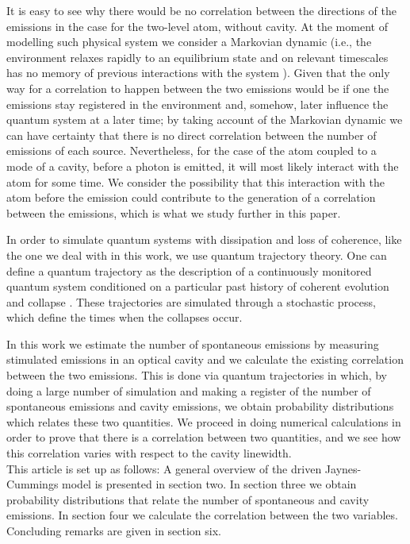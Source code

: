 \documentclass[conference]{IEEEtran}
\begin{document}
It is easy to see why there would be no correlation between the directions of the emissions in the case for the two-level atom, without cavity. At the moment of modelling such physical system we consider a Markovian dynamic (i.e., the environment relaxes rapidly to an equilibrium state and on relevant timescales has no memory of previous interactions with the system \cite{daley2014quantum}). Given that the only way for a correlation to happen between the two emissions would be if one the emissions stay registered in the environment and, somehow, later influence the quantum system at a later time; by taking account of the Markovian dynamic we can have certainty that there is no direct correlation between the number of emissions of each source. Nevertheless, for the case of the atom coupled to a mode of a cavity, before a photon is emitted, it will most likely interact with the atom for some time. We consider the possibility that this interaction with the atom before the emission could contribute to the generation of a correlation between the emissions, which is what we study further in this paper.

In order to simulate quantum systems with dissipation and loss of coherence, like the one we deal with in this work, we use quantum trajectory theory. %
One can define a quantum trajectory as the description of a continuously monitored quantum system conditioned on a particular past history of coherent evolution and collapse \cite{Carmichael1993Open}. These trajectories are simulated through a stochastic process, which define the times when the collapses occur.

In this work we estimate the number of spontaneous emissions by measuring stimulated emissions in an optical cavity and we calculate the existing correlation between the two emissions. This is done via quantum trajectories in which, by doing a large number of simulation and making a register of the number of spontaneous emissions and cavity emissions, we obtain probability distributions which relates these two quantities. We proceed in doing numerical calculations in order to prove that there is a correlation between two quantities, and we see how this correlation varies with respect to the cavity linewidth. \\


This article is set up as follows: A general overview of the driven Jaynes-Cummings model is presented in section two. In section three we obtain probability distributions that relate the number of spontaneous and cavity emissions. In section four we calculate the correlation between the two variables. Concluding remarks are given in section six.
\end{document}
